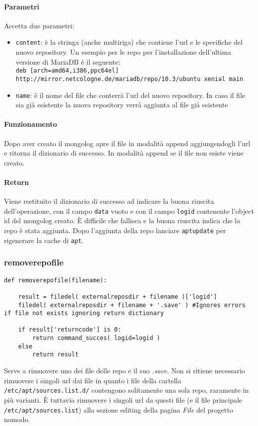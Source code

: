 \documentclass[11pt]{article}
\begin{document}
\paragraph{Parametri}
Accetta due parametri:
\begin{itemize}
	\item{\texttt{content}: è la stringa (anche multiriga) che contiene l'url e le specifiche del nuovo repository.
		Un esempio per le repo per l'installazione dell'ultima versione di MariaDB è il seguente:\\
		\texttt{deb [arch=amd64,i386,ppc64el] http://mirror.netcologne.de/mariadb/repo/10.3/ubuntu xenial main}}
	\item{\texttt{name}: è il nome del file che conterrà l'url del nuovo repository. In caso il file sia già esistente
		la nuova repository verrà aggiunta al file già esistente}
\end{itemize}
\paragraph{Funzionamento}
Dopo aver creato il mongolog apre il file in modalità append aggiungendogli l'url e ritorna il dizionario di successo.
In modalità append se il file non esiste viene creato.
\paragraph{Return}
Viene restituito il dizionario di successo ad indicare la buona riuscita dell'operazione, con il campo \texttt{data} vuoto
e con il campo \texttt{logid} contenente l'object id del mongolog creato. È difficile che fallisca e la buona riuscita indica
che la repo è stata aggiunta. Dopo l'aggiunta della repo lanciare \texttt{aptupdate} per rigenerare la cache di \texttt{apt}.

\subsubsection{removerepofile}\label{removerepofile}
\begin{lstlisting}
def removerepofile(filename):

    result = filedel( externalreposdir + filename )['logid']
    filedel( externalreposdir + filename + '.save' ) #Ignores errors if file not exists ignoring return dictionary

    if result['returncode'] is 0:
        return command_succes( logid=logid )
    else
        return result
\end{lstlisting}
Serve a rimuovere uno dei file delle repo e il suo \textit{.save}. Non si ritiene necessario rimuovere i singoli url dai file
in quanto i file della cartella \texttt{/etc/apt/sources.list.d/} contengono solitamente una sola repo, raramente in più varianti.
È tuttavia rimuovere i singoli url da questi file (e il file principale \texttt{/etc/apt/sources.list})
alla sezione editing della pagina \textit{File} del progetto nomodo.
\end{document}
